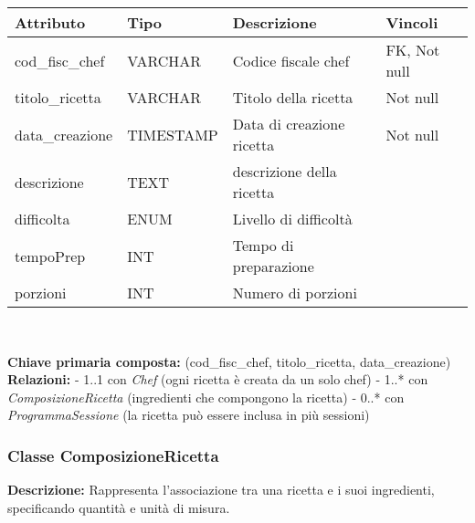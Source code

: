 \documentclass[a4paper, 12pt]{article}
\begin{document}
        {
        \vspace{1em}
        \renewcommand{\arraystretch}{1.3}
        \begin{tabularx}{\textwidth}{|l|l|X|l|}
        \hline
        \textbf{Attributo} & \textbf{Tipo} & \textbf{Descrizione} & \textbf{Vincoli} \\
        \hline
        cod\_fisc\_chef    & VARCHAR       & Codice fiscale chef & FK, Not null \\
        titolo\_ricetta    & VARCHAR       & Titolo della ricetta & Not null \\
        data\_creazione    & TIMESTAMP     & Data di creazione ricetta & Not null \\
        descrizione        & TEXT          & descrizione della ricetta & \\
        difficolta         & ENUM          & Livello di difficoltà & \\
        tempoPrep          & INT           & Tempo di preparazione & \\
        porzioni           & INT           & Numero di porzioni & \\
        \hline
        \end{tabularx}\\[0.5em]
        }
        
        \noindent\textbf{Chiave primaria composta:} (cod\_fisc\_chef, titolo\_ricetta, data\_creazione)\\[0.1em] 
        
        \noindent\textbf{Relazioni:}  
        - 1..1 con \textit{Chef} (ogni ricetta è creata da un solo chef)  
        - 1..* con \textit{ComposizioneRicetta} (ingredienti che compongono la ricetta)  
        - 0..* con \textit{ProgrammaSessione} (la ricetta può essere inclusa in più sessioni)

    \newpage

    \subsubsection*{Classe ComposizioneRicetta}
        \textbf{Descrizione:} Rappresenta l’associazione tra una ricetta e i suoi ingredienti, specificando quantità e unità di misura.
        
\end{document}
